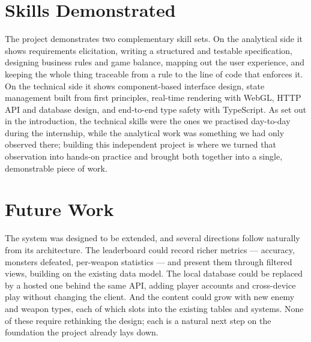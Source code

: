 \documentclass[12pt,a4paper]{report}
\begin{document}
\section{Skills Demonstrated}

The project demonstrates two complementary skill sets. On the analytical side it
shows requirements elicitation, writing a structured and testable specification,
designing business rules and game balance, mapping out the user experience, and
keeping the whole thing traceable from a rule to the line of code that enforces
it. On the technical side it shows component-based interface design, state
management built from first principles, real-time rendering with WebGL, HTTP API
and database design, and end-to-end type safety with TypeScript. As set out in
the introduction, the technical skills were the ones we practised day-to-day
during the internship, while the analytical work was something we had only
observed there; building this independent project is where we turned that
observation into hands-on practice and brought both together into a single,
demonstrable piece of work.

\section{Future Work}

The system was designed to be extended, and several directions follow naturally
from its architecture. The leaderboard could record richer metrics --- accuracy,
monsters defeated, per-weapon statistics --- and present them through filtered
views, building on the existing data model. The local database could be replaced
by a hosted one behind the same API, adding player accounts and cross-device play
without changing the client. And the content could grow with new enemy and weapon
types, each of which slots into the existing tables and systems. None of these
require rethinking the design; each is a natural next step on the foundation the
project already lays down.
\end{document}
